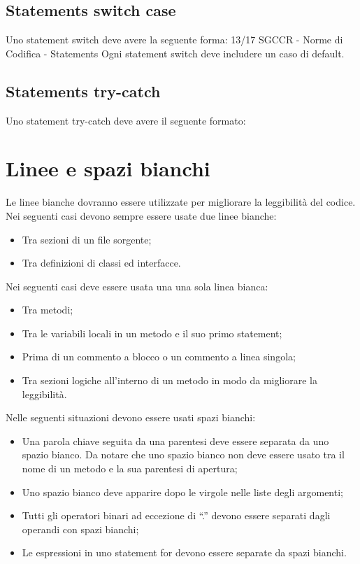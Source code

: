 \documentclass[11pt,titlepage,a4paper]{report}
\begin{document}
\subsection{Statements switch case}
Uno statement switch deve avere la seguente forma:
                                      13/17
SGCCR - Norme di Codifica - Statements
 Ogni statement switch deve includere un caso di default.
\subsection{Statements try-catch}
Uno statement try-catch deve avere il seguente formato:


\section{Linee e spazi bianchi}
Le linee bianche dovranno essere utilizzate per migliorare la leggibilit\`a del codice. Nei seguenti casi devono sempre essere usate due linee bianche:
\begin{itemize}
\item Tra sezioni di un file sorgente;
\item Tra definizioni di classi ed interfacce.
\end{itemize}
Nei seguenti casi deve essere usata una una sola linea bianca:
\begin{itemize}
\item Tra metodi;
\item Tra le variabili locali in un metodo e il suo primo statement;
\item Prima di un commento a blocco o un commento a linea singola;
\item Tra sezioni logiche all'interno di un metodo in modo da migliorare la leggibilità.
\end{itemize}
Nelle seguenti situazioni devono essere usati spazi bianchi:
\begin{itemize}
\item Una parola chiave seguita da una parentesi deve essere separata da uno spazio bianco. Da notare che uno spazio bianco non deve essere usato tra il nome di un metodo e la sua parentesi di apertura;
\item Uno spazio bianco deve apparire dopo le virgole nelle liste degli argomenti;
\item Tutti gli operatori binari ad eccezione di “.” devono essere separati dagli operandi con spazi bianchi;
\item Le espressioni in uno statement for devono essere separate da spazi bianchi.
\end{itemize}
\end{document}
